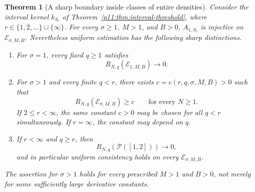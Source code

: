 \documentclass[11pt,letterpaper]{article}
\newtheorem{theorem}{Theorem}[section]
\theoremstyle{definition}
\theoremstyle{remark}
\newcommand{\1}{\mathbf 1}
\begin{document}
\begin{theorem}[A sharp boundary inside classes of entire densities]
\label{p11:thm:entire-gevrey-learning}
Consider the interval kernel $k_{S_r}$ of
Theorem~\ref{p11:thm:interval-threshold}, where
$r\in\{1,2,\ldots\}\cup\{\infty\}$.
For every $\sigma\geq1$, $M>1$, and $B>0$,
$A_{1,S_r}$ is injective on $\mathcal E_{\sigma,M,B}$.
Nevertheless uniform estimation has the following sharp distinctions.
\begin{enumerate}
\item For $\sigma=1$, every fixed $q\geq1$ satisfies
\[
 R_{N,q}(\mathcal E_{1,M,B})\longrightarrow0.
\]
\item For $\sigma>1$ and every finite $q<r$, there exists
$c=c(r,q,\sigma,M,B)>0$ such that
\[
 R_{N,q}(\mathcal E_{\sigma,M,B})\geq c
 \qquad\text{for every }N\geq1.
\]
If $2\leq r<\infty$, the same constant $c>0$ may be chosen for all
$q<r$ simultaneously.  If $r=\infty$, the constant may depend on $q$.
\item If $r<\infty$ and $q\geq r$, then
\[
 R_{N,q}(\mathcal P([1,2]))\longrightarrow0,
\]
and in particular uniform consistency holds on every
$\mathcal E_{\sigma,M,B}$.
\end{enumerate}
The assertion for $\sigma>1$ holds for every prescribed $M>1$ and
$B>0$, not merely for some sufficiently large derivative constants.
\end{theorem}
\end{document}
